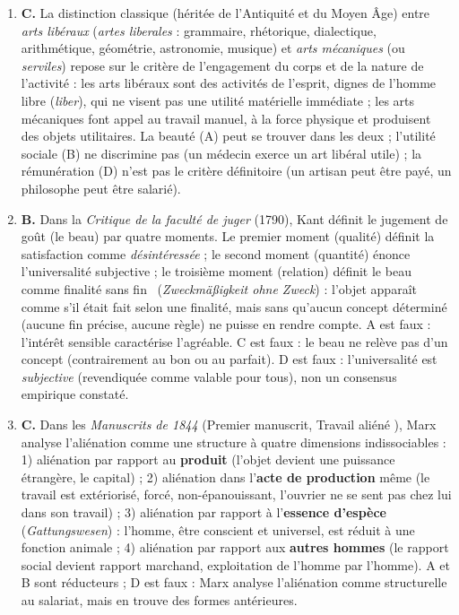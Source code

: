 \documentclass[11pt]{article}
\begin{document}
\begin{corrige}
\begin{enumerate}
\item \textbf{C.} La distinction classique (héritée de l'Antiquité et du Moyen Âge) entre \emph{arts libéraux} (\emph{artes liberales} : grammaire, rhétorique, dialectique, arithmétique, géométrie, astronomie, musique) et \emph{arts mécaniques} (ou \emph{serviles}) repose sur le critère de l'engagement du corps et de la nature de l'activité : les arts libéraux sont des activités de l'esprit, dignes de l'homme libre (\emph{liber}), qui ne visent pas une utilité matérielle immédiate ; les arts mécaniques font appel au travail manuel, à la force physique et produisent des objets utilitaires. La beauté (A) peut se trouver dans les deux ; l'utilité sociale (B) ne discrimine pas (un médecin exerce un art libéral utile) ; la rémunération (D) n'est pas le critère définitoire (un artisan peut être payé, un philosophe peut être salarié).
\item \textbf{B.} Dans la \emph{Critique de la faculté de juger} (1790), Kant définit le jugement de goût (le beau) par quatre moments. Le premier moment (qualité) définit la satisfaction comme \emph{désintéressée} ; le second moment (quantité) énonce l'universalité subjective ; le troisième moment (relation) définit le beau comme \guillemotleft finalité sans fin \guillemotright\ (\emph{Zweckmäßigkeit ohne Zweck}) : l'objet apparaît comme s'il était fait selon une finalité, mais sans qu'aucun concept déterminé (aucune fin précise, aucune règle) ne puisse en rendre compte. A est faux : l'intérêt sensible caractérise l'agréable. C est faux : le beau ne relève pas d'un concept (contrairement au bon ou au parfait). D est faux : l'universalité est \emph{subjective} (revendiquée comme valable pour tous), non un consensus empirique constaté.
\item \textbf{C.} Dans les \emph{Manuscrits de 1844} (Premier manuscrit, \guillemotleft Travail aliéné \guillemotright), Marx analyse l'aliénation comme une structure à quatre dimensions indissociables : 1) aliénation par rapport au \textbf{produit} (l'objet devient une puissance étrangère, le capital) ; 2) aliénation dans l'\textbf{acte de production} même (le travail est extériorisé, forcé, non-épanouissant, l'ouvrier ne se sent pas chez lui dans son travail) ; 3) aliénation par rapport à l'\textbf{essence d'espèce} (\emph{Gattungswesen}) : l'homme, être conscient et universel, est réduit à une fonction animale ; 4) aliénation par rapport aux \textbf{autres hommes} (le rapport social devient rapport marchand, exploitation de l'homme par l'homme). A et B sont réducteurs ; D est faux : Marx analyse l'aliénation comme structurelle au salariat, mais en trouve des formes antérieures.

\end{enumerate}
\end{corrige}
\end{document}
